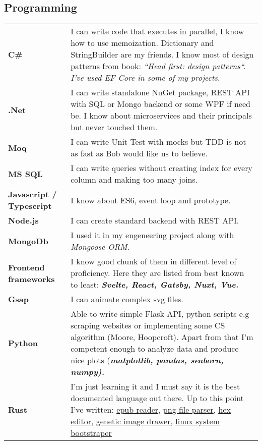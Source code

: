 \documentclass[10pt]{article}
\renewcommand{\arraystretch}{0}
\begin{document}
\subsection{Programming}
\renewcommand{\arraystretch}{2.5}
\begin{table}[H]
    \begin{tabularx}{\textwidth}{@{}l X}
         \textbf{C\#} & I can write code that executes in parallel, I know how to use memoization. Dictionary and StringBuilder are my friends. I know most of design patterns from book: \em ``Head first: design patterns``. I've used EF Core in some of my projects.\\
         \textbf{.Net} & I can write standalone NuGet package, REST API with SQL or Mongo backend or some WPF if need be. I know about microservices and their principals but never touched them. \\
         \textbf{Moq} & I can write Unit Test with mocks but TDD is not as fast as Bob would like us to believe.  \\
         \textbf{MS SQL} & I can write queries without creating index for every column and making too many joins. \\
	 \textbf{Javascript / Typescript} & I know about ES6, event loop and prototype.\\
	 \textbf{Node.js} & I can create standard backend with REST API.\\
         \textbf{MongoDb} & I used it in my engeneering project along with \emph{Mongoose ORM}. \\
         \textbf{Frontend frameworks} & I know good chunk of them in different level of proficiency. Here they are listed from best known to least: \bfseries \em Svelte, React, Gatsby, Nuxt, Vue. \\
         \textbf{Gsap} & I can animate complex svg files.\\
         \textbf{Python} & Able to write simple Flask API, python scripts e.g scraping websites or implementing some CS algorithm (Moore, Hoopcroft). Apart from that I'm competent enough to analyze data and produce nice plots (\bfseries \em matplotlib, pandas, seaborn, numpy). \\
         \textbf{Rust} & I'm just learning it and I must say it is the best documented language out there. Up to this point I've written: \href{https://github.com/Anav0/papcio-rs}{\underline{epub reader}}, 
         \href{https://github.com/Anav0/png-rs}{\underline{png file parser}}, 
         \href{https://github.com/Anav0/hex-rs}{\underline{hex editor}},
         \href{https://github.com/Anav0/genetic-draw-rs}{\underline{genetic image drawer}},
         \href{https://github.com/Anav0/ubuntu-bootstrap-rs}{\underline{linux system bootstraper}} \\
    \end{tabularx}
\end{table}
\end{document}
